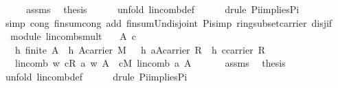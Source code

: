 \begin{isabellebody}
\ {\isacharminus}\isanewline
\ \ \isamarkupfalse%
\ assms\ \isamarkupfalse%
\ {\isacharquery}thesis\isanewline
\ \ \ \ \isamarkupfalse%
\ {\isacharparenleft}unfold\ lincomb{\isacharunderscore}def{\isacharparenright}\isanewline
\ \ \ \ \isamarkupfalse%
\ {\isacharparenleft}drule\ Pi{\isacharunderscore}implies{\isacharunderscore}Pi{}{\isacharparenright}{\isacharplus}\isanewline
\ \ \ \ \isamarkupfalse%
\ {\isacharparenleft}simp\ cong{\isacharcolon}\ finsum{\isacharunderscore}cong{}\ add{\isacharcolon}\ finsum{\isacharunderscore}Un{\isacharunderscore}disjoint\ Pi{\isacharunderscore}simp\ ring{\isacharunderscore}subset{\isacharunderscore}carrier\ disj{\isacharunderscore}if{\isacharparenright}\isanewline
{}\isamarkupfalse%
%
\endisatagproof
{\isafoldproof}%
%
\isadelimproof
\isanewline
%
\endisadelimproof
\isanewline
{}\isamarkupfalse%
\ {\isacharparenleft}\ module{\isacharparenright}\ lincomb{\isacharunderscore}smult{\isacharcolon}\isanewline
\ \ \ A\ c\isanewline
\ \ \ h{}{\isacharcolon}\ {\isachardoublequoteopen}finite\ A{\isachardoublequoteclose}\ \ h{}{\isacharcolon}\ {\isachardoublequoteopen}A{\isasymsubseteq}carrier\ M{\isachardoublequoteclose}\ \ \ h{}{\isacharcolon}\ {\isachardoublequoteopen}a{\isasymin}A{\isasymrightarrow}carrier\ R{\isachardoublequoteclose}\ \ h{}{\isacharcolon}\ {\isachardoublequoteopen}c{\isasymin}carrier\ R{\isachardoublequoteclose}\isanewline
\ \ \ {\isachardoublequoteopen}lincomb\ {\isacharparenleft}{\isasymlambda}w{\isachardot}\ c{\isasymotimes}\isactrlbsub R\isactrlesub \ a\ w{\isacharparenright}\ A\ {\isacharequal}\ c{\isasymodot}\isactrlbsub M\isactrlesub \ {\isacharparenleft}lincomb\ a\ A{\isacharparenright}{\isachardoublequoteclose}\isanewline
%
\isadelimproof
%
\endisadelimproof
%
\isatagproof
{}\isamarkupfalse%
\ {\isacharminus}\ \isanewline
\ \ \isamarkupfalse%
\ assms\ \isamarkupfalse%
\ {\isacharquery}thesis\isanewline
\ \ \ \ \isamarkupfalse%
\ {\isacharparenleft}unfold\ lincomb{\isacharunderscore}def{\isacharparenright}\isanewline
\ \ \ \ \isamarkupfalse%
\ {\isacharparenleft}drule\ Pi{\isacharunderscore}implies{\isacharunderscore}Pi{}{\isacharparenright}{\isacharplus}\isanewline
\ \ \ \ \isamarkupfalse%

\end{isabellebody}
